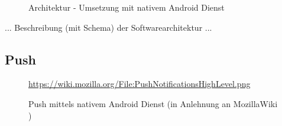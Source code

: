 \begin{figure}[htp] 
\caption{Architektur - Umsetzung mit nativem Android Dienst }
\label{image_architektur-android-push}
\end{figure}  

... Beschreibung (mit Schema) der Softwarearchitektur ...

\newpage
\subsection{Push}

\begin{figure}[htp] 
\caption{Push mittels nativem Android Dienst (in Anlehnung an MozillaWiki \cite{MOZ_WIKI})}
\quelle\url{https://wiki.mozilla.org/File:PushNotificationsHighLevel.png}
\label{image_architektur-android-push}
\end{figure}  

